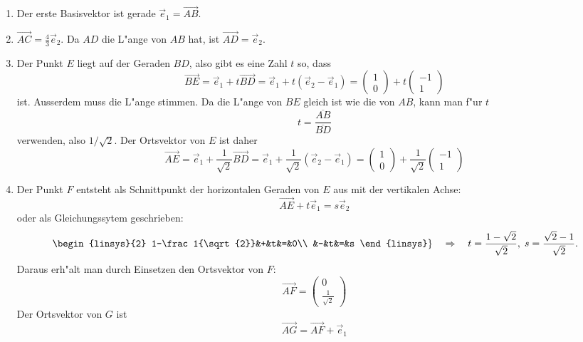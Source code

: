 \begin{loesung}
\begin{teilaufgaben}
\item
\renewcommand{\labelenumii}{\arabic{enumii}.}
\begin{enumerate}
\item Der erste Basisvektor ist gerade $\vec{e}_1=\overrightarrow{AB}$.
\item $\overrightarrow{AC}=\frac43 \vec{e}_2$.
Da $AD$ die L"ange von $AB$ hat, ist $\overrightarrow{AD}=\vec{e}_2$.
\item Der Punkt $E$ liegt auf der Geraden $BD$, also gibt es eine
Zahl  $t$ so, dass
\[
\overrightarrow{BE}
=
\vec{e}_1+t\overrightarrow{BD}
=
\vec{e}_1+t(\vec{e}_2-\vec{e}_1)
=
\begin{pmatrix}1\\0\end{pmatrix}+t\begin{pmatrix}-1\\1\end{pmatrix}
\]
ist.
Ausserdem muss die L"ange stimmen.
Da die L"ange von $BE$ gleich ist wie die von $AB$, kann man f"ur $t$
\[
t=\frac{\overline{AB}}{\overline{BD}}
\]
verwenden, also $1/\sqrt{2}$.
Der Ortsvektor von $E$ ist daher
\[
\overrightarrow{AE}
=
\vec{e}_1+\frac1{\sqrt{2}}\overrightarrow{BD}
=
\vec{e}_1+\frac1{\sqrt{2}}(\vec{e}_2-\vec{e}_1)
=
\begin{pmatrix}1\\0\end{pmatrix}+\frac1{\sqrt{2}}\begin{pmatrix}-1\\1\end{pmatrix}
\]
\item Der Punkt $F$ entsteht als Schnittpunkt der horizontalen Geraden von
$E$ aus mit der vertikalen Achse:
\[
\overrightarrow{AE}+t\vec{e}_1 = s\vec{e}_2
\]
oder als Gleichungssytem geschrieben:
\[
\left.
\begin{linsys}{2}
1-\frac1{\sqrt{2}}&+&t&=&0\\
                  &-&t&=&s
\end{linsys}
\right\}
\quad\Rightarrow\quad
t=\frac{1-\sqrt{2}}{\sqrt{2}},
\;
s=\frac{\sqrt{2}-1}{\sqrt{2}}.
\]
Daraus erh"alt man durch Einsetzen den Ortsvektor von $F$:
\[
\overrightarrow{AF}
=
\begin{pmatrix}
0\\\frac1{\sqrt{2}}
\end{pmatrix}
\]
Der Ortsvektor von $G$ ist
\[
\overrightarrow{AG}
=
\overrightarrow{AF}+\vec{e}_1
\]
\end{enumerate}
\end{teilaufgaben}
\end{loesung}
